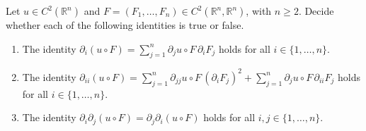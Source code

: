 \begin{exercise}
\label{ex:examHS24_TF_chain_rule}
Let $u \in C^2(\mathbb{R}^n)$ and $F = (F_1, \dots, F_n) \in C^2(\mathbb{R}^n, \mathbb{R}^n)$, with
$n \ge 2$. Decide whether each of the following identities is true or false.
\begin{enumerate}[label=\textbf{(\alph*)}]
  \item The identity $\partial_i(u \circ F) = \sum_{j=1}^n \partial_ju \circ F \, \partial_iF_j$ holds for all $i \in \{1, \dots, n\}$.
  \item The identity $\partial_{ii}(u \circ F) = \sum_{j=1}^n \partial_{jj}u \circ F \, (\partial_iF_j)^2 + \sum_{j=1}^n \partial_ju \circ F \, \partial_{ii}F_j$ holds for all $i \in \{1, \dots, n\}$.
  \item The identity $\partial_i\partial_j(u \circ F) = \partial_j\partial_i(u \circ F)$ holds for all $i, j \in \{1, \dots, n\}$.
\end{enumerate}
\end{exercise}

